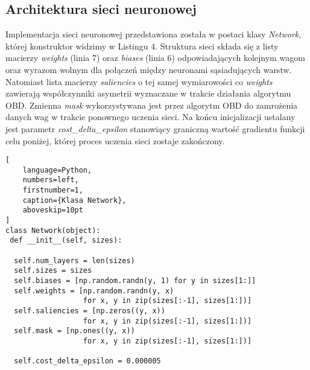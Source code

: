 \subsection{Architektura sieci neuronowej}
Implementacja sieci neuronowej przedstawiona została w postaci klasy \emph{Network}, której konstruktor widzimy w Listingu 4. Struktura sieci składa się z listy macierzy \emph{weights} (linia 7) oraz \emph{biases} (linia 6) odpowiadających kolejnym wagom oraz wyrazom wolnym dla połączeń między neuronami sąsiadujących warstw. Natomiast lista macierzy \emph{saliencies} o tej samej wymiarowości co \emph{weights} zawierają współczynniki asymetrii wyznaczane w trakcie działania algorytmu OBD. Zmienna \emph{mask} wykorzystywana jest przez algorytm OBD do zamrożenia danych wag w trakcie ponownego uczenia sieci. Na końcu inicjalizacji ustalany jest parametr \emph{cost{\_}delta{\_}epsilon} stanowiący graniczną wartość gradientu funkcji celu poniżej, której proces uczenia sieci zostaje zakończony.    
\begin{addmargin}[10mm]{0mm}
\begin{lstlisting}[
    language=Python,
    numbers=left,
    firstnumber=1,
    caption={Klasa Network},
    aboveskip=10pt
]
class Network(object):
 def __init__(self, sizes):
 
  self.num_layers = len(sizes)
  self.sizes = sizes
  self.biases = [np.random.randn(y, 1) for y in sizes[1:]]
  self.weights = [np.random.randn(y, x)
                  for x, y in zip(sizes[:-1], sizes[1:])]
  self.saliencies = [np.zeros((y, x))
                  for x, y in zip(sizes[:-1], sizes[1:])]
  self.mask = [np.ones((y, x))
                  for x, y in zip(sizes[:-1], sizes[1:])]

  self.cost_delta_epsilon = 0.000005
\end{lstlisting}
\end{addmargin}
